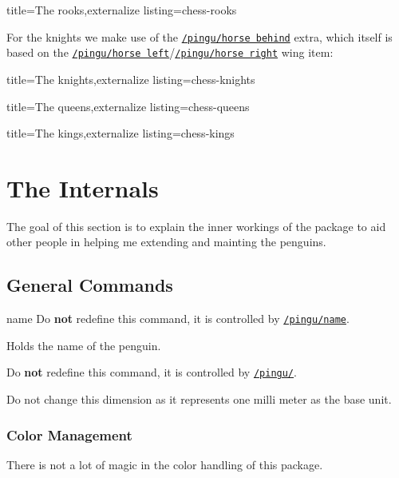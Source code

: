 \documentclass[parskip=half,english,numbers=noenddot,footnotes=nomultiple,oneside]{scrartcl}
\makeatletter
\def\lpingu#1{\lstinline[style=lstpingu,language=pingulang]'#1'}
\let\@explainsuff\@empty
\let\@labelhack\@empty
\newcommand*\keyref[2][/pingu/]{\hyperref[pk:#1#2]{\lpingu{#1#2}}}
\newenvironment{commandexplain}[3][]{%
\begingroup
\def\@labelhack{/pingu/}%
\def\mand##1{\texttt{\{\textsf{\smaller##1}\}}}%
\def\@pingu@command@keypartner{#1}%
\newcommand\opt[2][]{\texttt{\textit{[\textsf{\smaller##2\ifx!##1!\else\textcolor{gray}{\smaller\sffamily=##1}\fi}]}}}%
\def\@explainsuff{#3}%
\keyexplain[]{\\#2}{}{}%
\ifx\@pingu@command@keypartner\@empty\else
{\@declaredcolor{gray}\footnotesize Do \textbf{not} redefine this command, it is controlled by \keyref{#1}.}\par\fi
}{\endkeyexplain\endgroup}
\makeatother
\begin{document}
\begin{tcblisting}{title={The rooks},externalize listing=chess-rooks}
\tikz{\pingu[body=pingu@black,rook]}
\tikz{\pingu[:back,rook,rook hatch=false]}
\end{tcblisting}

For the knights we make use of the \keyref{horse behind} extra, which itself is based on the \keyref{horse left}/\keyref{horse right} wing item:
\begin{tcblisting}{title={The knights},externalize listing=chess-knights}
\tikz{\pingu[body=pingu@black,horse behind]}
\tikz{\pingu[:back,horse behind=pingu@black,on horse flip]}
\end{tcblisting}

\begin{tcblisting}{title={The queens},externalize listing=chess-queens}
\tikz{\pingu[body=pingu@black,princess crown=pingu@bronze]}
\tikz{\pingu[:back,princess crown=pingu@bronze]}
\end{tcblisting}


\begin{tcblisting}{title={The kings},externalize listing=chess-kings}
\tikz{\pingu[body=pingu@black,crown]}
\end{tcblisting}

\section{The Internals}
The goal of this section is to explain the inner workings of the package to aid other people in helping me extending and mainting the penguins.

\subsection{General Commands}

\begin{commandexplain}[name]{pingu@name}{}
	Holds the name of the penguin.
\end{commandexplain}

\begin{commandexplain}{pingu@one}{}
	Do not change this dimension as it represents one milli meter as the base unit.
\end{commandexplain}

\subsubsection{Color Management}
There is not a lot of magic in the color handling of this package.
\end{document}
